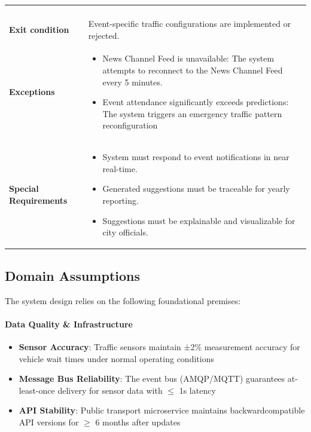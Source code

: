 \documentclass[11.5pt]{article}
\begin{document}
\begin{table}[H]
\begin{tabular}{@{} l p{23em} @{}}
\begin{enumerate}[left=0pt, parsep=0pt, topsep=0pt]
            \end{enumerate}
             \\
            \textbf{Exit condition} & Event-specific traffic configurations are implemented or rejected. \\
            \textbf{Exceptions} & 
            \begin{itemize}[left=0pt, parsep=0pt, topsep=0pt]
                \item News Channel Feed is unavailable: The system attempts to reconnect to the News Channel Feed every 5 minutes.
                \item Event attendance significantly exceeds predictions: The system triggers an emergency traffic pattern reconfiguration
            \end{itemize} \\
            \textbf{Special Requirements} & 
            \begin{itemize}[left=0pt, parsep=0pt, topsep=0pt]
                \item System must respond to event notifications in near real-time.
                \item Generated suggestions must be traceable for yearly reporting.
                \item Suggestions must be explainable and visualizable for city officials.
            \end{itemize} \\
            \bottomrule
        \end{tabular}
    \end{table}
    
    \subsection{Domain Assumptions}
    The system design relies on the following foundational premises:
    
    \paragraph{Data Quality \& Infrastructure}
    \begin{itemize}
        \item \textbf{Sensor Accuracy}: Traffic sensors maintain ±2\% measurement accuracy for vehicle wait times under normal operating conditions
        \item \textbf{Message Bus Reliability}: The event bus (AMQP/MQTT) guarantees at-least-once delivery for sensor data with $\le$ 1s latency
        \item \textbf{API Stability}: Public transport microservice maintains backward\-compatible API versions for $\ge$ 6 months after updates
    \end{itemize}
    
\end{document}

